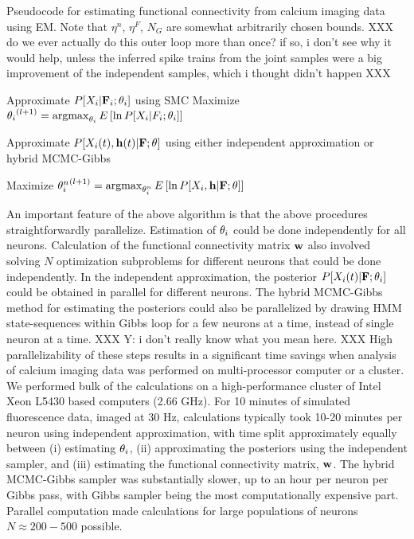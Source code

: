 \begin{algorithm}
\caption{Pseudocode for estimating functional connectivity from calcium imaging data using EM. Note that $\eta^n$, $\eta^F$, $N_G$ are somewhat arbitrarily chosen bounds.  XXX do we ever actually do this outer loop more than once? if so, i don't see why it would help, unless the inferred spike trains from the joint samples were a big improvement of the independent samples, which i thought didn't happen XXX}
\label{eqn:pseudocode}
\begin{algorithmic}
      \State Approximate $P[X_i|{\bf F}_i; \mathbf{\theta}_i]$ using SMC
      \State Maximize ${\mathbf{\theta}_i}^{(l+1)}=\operatorname*{argmax}_{\mathbf{\theta}_i} E\left[\ln P[X_i | F_i; \mathbf{\theta}_i] \right]$
    \EndWhile
  \EndFor
  
      \State Approximate $P[X_i(t), \mathbf{h}(t) |{\bf F}; \mathbf{\theta}]$ using either independent approximation or hybrid MCMC-Gibbs
    \EndFor

  	\State Maximize ${\mathbf{\theta}^n_i}^{(l+1)}=\operatorname*{argmax}_{\mathbf{\theta}^n_i} E\left[\ln P[X_i, \mathbf{h} | {\bf F}; \mathbf{\theta}]\right]$  
  \EndFor

\EndWhile
\end{algorithmic}
\end{algorithm}


An important feature of the above algorithm is that the above procedures straightforwardly parallelize. Estimation of  $\mathbf{\theta}_i$ could be done independently for all neurons. Calculation of the functional connectivity matrix $\mathbf{w}$ also involved solving $N$ optimization subproblems for different neurons that could be done independently. In the independent approximation, the posterior $P[X_i(t) | {\bf F}; \mathbf{\theta}_i]$ could be obtained in parallel for different neurons.  The hybrid MCMC-Gibbs method for estimating the posteriors could also be parallelized by drawing HMM state-sequences within Gibbs loop for a few neurons at a time, instead of single neuron at a time. XXX Y: i don't really know what you mean here. XXX High parallelizability of these steps results in a significant time savings when analysis of calcium imaging data was performed on multi-processor computer or a cluster.  We performed bulk of the calculations on a high-performance cluster of Intel Xeon L5430 based computers (2.66 GHz). For 10 minutes of simulated fluorescence data, imaged at $30$ Hz, calculations typically took 10-20 minutes per neuron using independent approximation, with time split approximately equally between (i) estimating $\mathbf{\theta}_i$,  (ii) approximating the posteriors using the independent sampler, and (iii) estimating the functional connectivity matrix, $\mathbf{w}$. The hybrid MCMC-Gibbs sampler was substantially slower, up to an hour per neuron per Gibbs pass, with Gibbs sampler being the most computationally expensive part. Parallel computation made calculations for large populations of neurons $N\approx 200-500$ possible.
